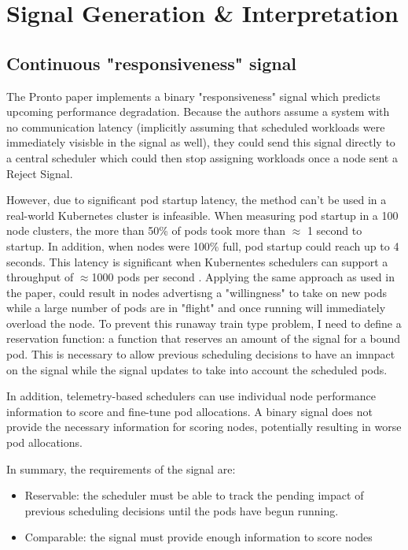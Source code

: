 \section{Signal Generation \& Interpretation}

\subsection{Continuous "responsiveness" signal}
The Pronto paper implements a binary "responsiveness" signal which predicts
upcoming performance degradation. Because the authors assume a system with no
communication latency (implicitly assuming that scheduled workloads were
immediately visisble in the signal as well), they could send this signal
directly to a central scheduler which could then stop assigning workloads once a
node sent a Reject Signal.

However, due to significant pod startup latency, the method can't be used in a
real-world Kubernetes cluster is infeasible. When measuring pod startup in a
100 node clusters, the more than 50\% of pods took more than $\approx$ 1 second
to startup. In addition, when nodes were 100\% full, pod startup could reach up
to 4 seconds. This latency is significant when Kubernentes schedulers can
support a throughput of $\approx$1000 pods per second
\cite{qadeer_scaling_2022}. Applying the same approach as used in the paper,
could result in nodes advertisng a "willingness" to take on new pods while
a large number of pods are in "flight" and once running will immediately
overload the node. To prevent this runaway train type problem, I need to define
a reservation function: a function that reserves an amount of the signal for a
bound pod. This is necessary to allow previous scheduling decisions to have an
imnpact on the signal while the signal updates to take into account the
scheduled pods.

In addition, telemetry-based schedulers can use individual node performance
information to score and fine-tune pod allocations. A binary signal does not
provide the necessary information for scoring nodes, potentially resulting in
worse pod allocations.

In summary, the requirements of the signal are:
\begin{itemize}
    \item Reservable: the scheduler must be able to track the pending impact of
        previous scheduling decisions until the pods have begun running.
    \item Comparable: the signal must provide enough information to score nodes
\end{itemize}

